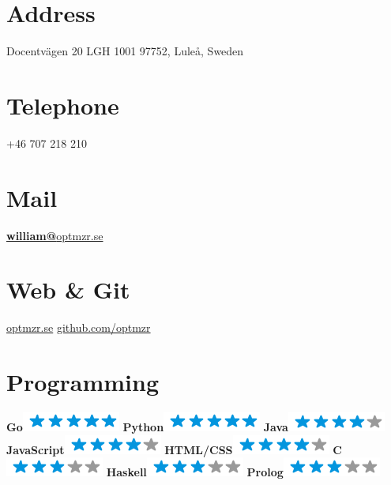 \documentclass[]{friggeri-cv}
\begin{document}

\begin{aside}
  \section{Address}
    Docentvägen 20 LGH 1001
    97752, Luleå, Sweden
    ~
  \section{Telephone}
    +46 707 218 210
    ~
  \section{Mail}
    \href{mailto:william@optmzr.se}{\textbf{william@}optmzr.se}
    ~
  \section{Web \& Git}
    \href{https://optmzr.se}{optmzr.se}
    \href{https://github.com/optmzr}{github.com/optmzr}
    ~
  \section{Programming}
    \textbf{Go}\includegraphics[scale=0.40]{img/5stars.png}
    \textbf{Python}\includegraphics[scale=0.40]{img/5stars.png}
    \textbf{Java}\includegraphics[scale=0.40]{img/4stars.png}
    \textbf{JavaScript}\includegraphics[scale=0.40]{img/4stars.png}
    \textbf{HTML/CSS}\includegraphics[scale=0.40]{img/4stars.png}
    \textbf{C}\includegraphics[scale=0.40]{img/3stars.png}
    \textbf{Haskell}\includegraphics[scale=0.40]{img/3stars.png}
    \textbf{Prolog}\includegraphics[scale=0.40]{img/3stars.png}
    ~

\end{aside}
\end{document}
